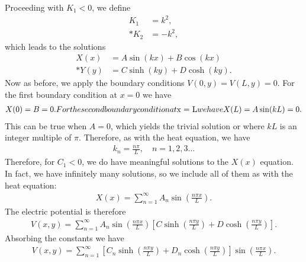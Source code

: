 Proceeding with $K_1 < 0$, we define
\begin{align}
  K_1 &= k^2 , \nonumber \\*
  K_2 &= -k^2 , \nonumber
\end{align}
which leads to the solutions
\begin{subequations}
\begin{align}
  X(x) &= A \sin ( k x ) + B \cos ( k x ) \\*
  Y(y) &= C \sinh ( k y ) + D \cosh ( k y ) .
\end{align}
\end{subequations}
Now as before, we apply the boundary conditions $V(0,y) = V(L,y) = 0$. For the first boundary condition at $x = 0$ we have
\begin{subequations}
\begin{align}
  X(0) = B = 0 .
\end{align}
For the second boundary condition at $x = L$ we have
\begin{align}
  X(L) = A \sin ( k L ) = 0 .
\end{align}
\end{subequations}
This can be true when $A = 0$, which yields the trivial solution or where $k L$ is an integer multiple of $\pi$. Therefore, as with the heat equation, we have
\begin{align}
  k_n = \frac{ n \pi }{ L }, \quad n = 1, 2, 3 \ldots
\end{align}
Therefore, for $C_1 < 0$, we do have meaningful solutions to the $X(x)$ equation. In fact, we have infinitely many solutions, so we include all of them as with the heat equation:
\begin{align}
  X(x) = \sum_{n=1}^\infty A_n \sin \left( \frac{n\pi x}{L} \right) .
\end{align}
The electric potential is therefore
\begin{align}
  V(x,y) = \sum_{n=1}^\infty A_n \sin \left( \frac{n\pi x}{L} \right) \left[ C \sinh \left( \frac{n\pi y}{L} \right) + D \cosh \left( \frac{n\pi y}{L} \right) \right] . 
\end{align}
Absorbing the constants we have
\begin{align}
  V(x,y) = \sum_{n=1}^\infty  \left[ C_n \sinh \left( \frac{n\pi y}{L} \right) + D_n \cosh \left( \frac{n\pi y}{L} \right) \right] \sin \left( \frac{n\pi x}{L} \right) .
\end{align}

